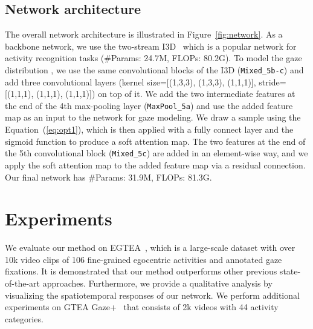\documentclass[10pt,twocolumn,letterpaper]{article}
\begin{document}
\subsection{Network architecture} \label{subsec:network}

The overall network architecture is illustrated in Figure~\ref{fig:network}. As a backbone network, we use the two-stream I3D~\cite{carreira2017quo} which is a popular network for activity recognition tasks (\#Params: 24.7M, FLOPs: 80.2G). To model the gaze distribution , we use the same convolutional blocks of the I3D (\texttt{Mixed\_5b-c}) and add three convolutional layers (kernel size=[(1,3,3), (1,3,3), (1,1,1)], stride=[(1,1,1), (1,1,1), (1,1,1)]) on top of it. We add the two intermediate features at the end of the 4th max-pooling layer (\texttt{MaxPool\_5a}) and use the added feature map as an input to the network for gaze modeling. We draw a sample  using the Equation~(\ref{eq:opt1}), which is then applied with a fully connect layer and the sigmoid function to produce a soft attention map. The two features at the end of the 5th convolutional block (\texttt{Mixed\_5c}) are added in an element-wise way, and we apply the soft attention map to the added feature map via a residual connection. Our final network has \#Params: 31.9M, FLOPs: 81.3G.

\section{Experiments} \label{sec:exp}
We evaluate our method on EGTEA~\cite{li2018eye}, which is a large-scale dataset with over 10k video clips of 106 fine-grained egocentric activities and annotated gaze fixations. It is demonstrated that our method outperforms other previous state-of-the-art approaches. Furthermore, we provide a qualitative analysis by visualizing the spatiotemporal responses of our network. We perform additional experiments on GTEA Gaze+~\cite{li2015delving} that consists of 2k videos with 44 activity categories.
\end{document}

